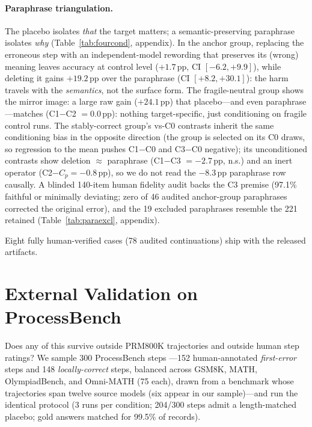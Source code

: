\documentclass[11pt]{article}
\newcommand{\ci}[2]{[#1, #2]}
\begin{document}
\paragraph{Paraphrase triangulation.}
The placebo isolates \emph{that} the target matters; a semantic-preserving paraphrase isolates \emph{why} (Table~\ref{tab:fourcond}, appendix). In the anchor group, replacing the erroneous step with an independent-model rewording that preserves its (wrong) meaning leaves accuracy at control level ($+1.7$\,pp, CI $\ci{-6.2}{+9.9}$), while deleting it gains $+19.2$\,pp over the paraphrase (CI $\ci{+8.2}{+30.1}$): the harm travels with the \emph{semantics}, not the surface form. The fragile-neutral group shows the mirror image: a large raw gain ($+24.1$\,pp) that placebo---and even paraphrase---matches (C1$-$C2 $= 0.0$\,pp): nothing target-specific, just conditioning on fragile control runs. The stably-correct group's vs-C0 contrasts inherit the same conditioning bias in the opposite direction (the group is selected on its C0 draws, so regression to the mean pushes C1$-$C0 and C3$-$C0 negative); its unconditioned contrasts show deletion $\approx$ paraphrase (C1$-$C3 $=-2.7$\,pp, n.s.) and an inert operator (C2$-C_p=-0.8$\,pp), so we do not read the $-8.3$\,pp paraphrase row causally. A blinded 140-item human fidelity audit backs the C3 premise (97.1\% faithful or minimally deviating; zero of 46 audited anchor-group paraphrases corrected the original error), and the 19 excluded paraphrases resemble the 221 retained (Table~\ref{tab:paraexcl}, appendix).

Eight fully human-verified cases (78 audited continuations) ship with the released artifacts.

\section{External Validation on ProcessBench}
\label{sec:external}

Does any of this survive outside PRM800K trajectories and outside human step ratings? We sample 300 ProcessBench steps \citep{zheng2025processbench}---152 human-annotated \emph{first-error} steps and 148 \emph{locally-correct} steps, balanced across GSM8K, MATH, OlympiadBench, and Omni-MATH (75 each), drawn from a benchmark whose trajectories span twelve source models (six appear in our sample)---and run the identical protocol (3 runs per condition; 204/300 steps admit a length-matched placebo; gold answers matched for 99.5\% of records).
\end{document}

